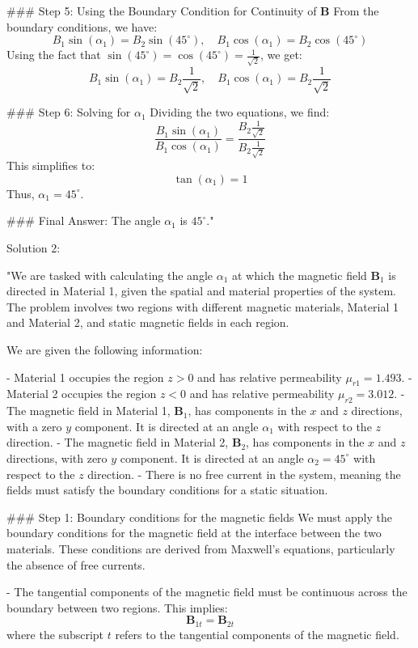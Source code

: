 ### Step 5: Using the Boundary Condition for Continuity of $\mathbf{B}$
From the boundary conditions, we have:
\[
B_1 \sin(\alpha_1) = B_2 \sin(45^\circ), \quad B_1 \cos(\alpha_1) = B_2 \cos(45^\circ)
\]
Using the fact that $\sin(45^\circ) = \cos(45^\circ) = \frac{1}{\sqrt{2}}$, we get:
\[
B_1 \sin(\alpha_1) = B_2 \frac{1}{\sqrt{2}}, \quad B_1 \cos(\alpha_1) = B_2 \frac{1}{\sqrt{2}}
\]

### Step 6: Solving for $\alpha_1$
Dividing the two equations, we find:
\[
\frac{B_1 \sin(\alpha_1)}{B_1 \cos(\alpha_1)} = \frac{B_2 \frac{1}{\sqrt{2}}}{B_2 \frac{1}{\sqrt{2}}}
\]
This simplifies to:
\[
\tan(\alpha_1) = 1
\]
Thus, $\alpha_1 = 45^\circ$.

### Final Answer:
The angle $\alpha_1$ is $45^\circ$."

Solution 2:

"We are tasked with calculating the angle $\alpha_1$ at which the magnetic field $\mathbf{B}_1$ is directed in Material 1, given the spatial and material properties of the system. The problem involves two regions with different magnetic materials, Material 1 and Material 2, and static magnetic fields in each region.

We are given the following information:

- Material 1 occupies the region $z > 0$ and has relative permeability $\mu_{r1} = 1.493$. 
- Material 2 occupies the region $z < 0$ and has relative permeability $\mu_{r2} = 3.012$.
- The magnetic field in Material 1, $\mathbf{B}_1$, has components in the $x$ and $z$ directions, with a zero $y$ component. It is directed at an angle $\alpha_1$ with respect to the $z$ direction.
- The magnetic field in Material 2, $\mathbf{B}_2$, has components in the $x$ and $z$ directions, with zero $y$ component. It is directed at an angle $\alpha_2 = 45^\circ$ with respect to the $z$ direction.
- There is no free current in the system, meaning the fields must satisfy the boundary conditions for a static situation.

### Step 1: Boundary conditions for the magnetic fields
We must apply the boundary conditions for the magnetic field at the interface between the two materials. These conditions are derived from Maxwell’s equations, particularly the absence of free currents.

- The tangential components of the magnetic field must be continuous across the boundary between two regions. This implies:
  \[
  \mathbf{B}_{1t} = \mathbf{B}_{2t}
  \]
  where the subscript $t$ refers to the tangential components of the magnetic field.

